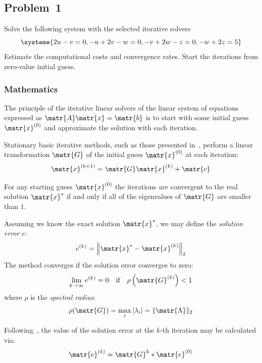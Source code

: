 \subsection{Problem~1}%
\label{problem:1}

Solve the following system with the selected iterative solvers
\begin{equation*}
  \systeme{2u-v=0,-u+2v-w=0,-v+2w-z=0,-w+2z=5}
\end{equation*}
Estimate the computational costs and convergence rates.
Start the iterations from zero-value initial guess.

\subsubsection*{Mathematics}

The principle of the iterative linear solvers of the linear system of equations
expressed as $\matr{A}\matr{x}=\matr{b}$ is to start with some initial guess
$\matr{x}^{(0)}$ and approximate the solution with each iteration.

Stationary basic iterative methods, such as those presented in~,
perform a linear transformation $\matr{G}$ of the initial guess $\matr{x}^{(0)}$ at each
iteration:
\begin{equation*}
  \matr{x}^{(k+1)} = \matr{G}\matr{x}^{(k)} + \matr{c}
\end{equation*}

For any starting guess $\matr{x}^{(0)}$ the iterations are convergent to the real
solution $\matr{x}^{*}$ if and only if all of the eigenvalues of $\matr{G}$ are smaller
than $1$.

Assuming we know the exact solution $\matr{x}^*$, we may define the
\textit{solution error} $e$:
\begin{equation*}
  e^{(k)} = {\left\lVert\matr{x}^{*}-\matr{x}^{(k)}\right\rVert}_2
\end{equation*}
The method converges if the solution error converges to zero:
\begin{equation}
  \label{eqn:convergence_criterion}
  \lim_{k\to\infty}{e^{(k)}} = 0
  \quad \text{if} \quad
  \rho\left(\matr{G}^{(k)}\right) < 1
\end{equation}
where $\rho$ is the \textit{spectral radius}:
\begin{equation*}
  \rho(\matr{G}) = \max_i{\lvert\lambda_i\rvert} = \lVert\matr{\Lambda}\rVert_2
\end{equation*}

Following~\cite{Zdunek}, the value of the solution error at the $k$-th iteration may be
calculated via:
\begin{equation}
  \matr{e}^{(k)} = \matr{G}^k * \matr{e}^{(0)}
\end{equation}

